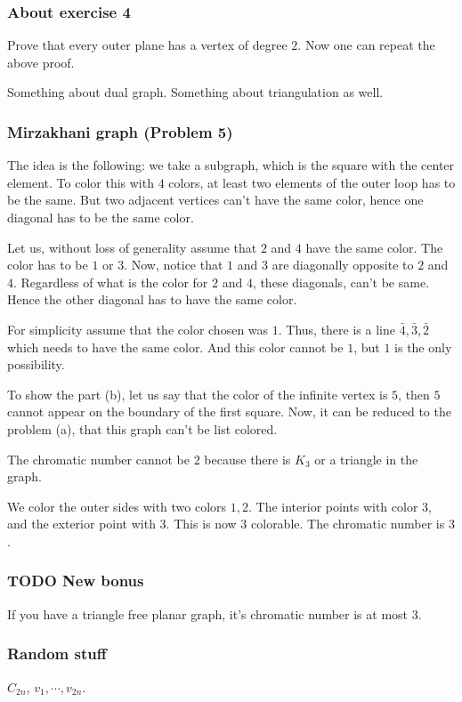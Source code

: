 \documentclass[11pt]{article}
\begin{document}
\subsubsection{About exercise 4}
\label{sec:orgcabf3f2}
Prove that every outer plane has a vertex of degree \(2\). Now one can repeat
the above proof.

Something about dual graph. Something about triangulation as well.
\subsubsection{Mirzakhani graph (Problem 5)}
\label{sec:org0256131}
The idea is the following: we take a subgraph, which is the square with the
center element. To color this with \(4\) colors, at least two elements of the
outer loop has to be the same. But two adjacent vertices can't have the same
color, hence one diagonal has to be the same color.

Let us, without loss of generality assume that \(2\) and \(4\) have the same
color. The color has to be \(1\) or \(3\). Now, notice that \(1\) and \(3\) are
diagonally opposite to \(2\) and \(4\). Regardless of what is the color for \(2\)
and \(4\), these diagonals, can't be same. Hence the other diagonal has to
have the same color.

For simplicity assume that the color chosen was \(1\). Thus, there is a line
\(\bar{4}, \bar{3}, \bar{2}\) which needs to have the same color. And this
color cannot be \(1\), but \(1\) is the only possibility.

To show the part (b), let us say that the color of the infinite vertex is
\(5\), then \(5\) cannot appear on the boundary of the first square. Now, it can
be reduced to the problem (a), that this graph can't be list colored.

The chromatic number cannot be \(2\) because there is \(K_3\) or a triangle in
the graph.

We color the outer sides with two colors \(1, 2\). The interior points with
color \(3\), and the exterior point with \(3\). This is now \(3\) colorable. The
chromatic number is \(3\).
\subsubsection{{\bfseries\sffamily TODO} New bonus}
\label{sec:orgccdde93}
If you have a triangle free planar graph, it's chromatic number is at most \(3\).
\subsubsection{Random stuff}
\label{sec:org50f21c6}
\(C_{2n}\), \(v_1, \cdots, v_{2n}\).
\end{document}
